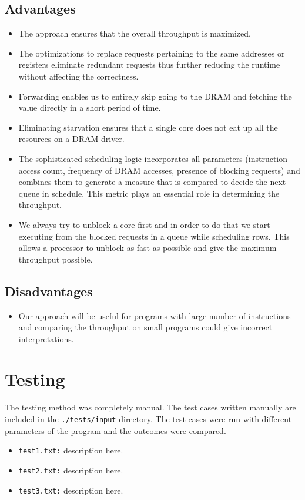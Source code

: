 \documentclass[hidelinks,12pt]{article}
\begin{document}
\subsection{Advantages}
\begin{itemize}
    \item The approach ensures that the overall throughput is maximized.
    \item The optimizations to replace requests pertaining to the same addresses or registers eliminate redundant requests thus further reducing the runtime without affecting the correctness.
    \item Forwarding enables us to entirely skip going to the DRAM and fetching the value directly in a short period of time.
    \item Eliminating starvation ensures that a single core does not eat up all the resources on a DRAM driver.
    \item The sophisticated scheduling logic incorporates all parameters (instruction access count, frequency of DRAM accesses, presence of blocking requests) and combines them to generate a measure that is compared to decide the next queue in schedule. This metric plays an essential role in determining the throughput.
    \item We always try to unblock a core first and in order to do that we start executing from the blocked requests in a queue while scheduling rows. This allows a processor to unblock as fast as possible and give the maximum throughput possible.
\end{itemize}
\subsection{Disadvantages}
\begin{itemize}
    \item Our approach will be useful for programs with large number of instructions and comparing the throughput on small programs could give incorrect interpretations.
\end{itemize}
\section{Testing}

The testing method was completely manual. The test cases written manually are included in the \verb|./tests/input| directory. The test cases were run with different parameters
of the program and the outcomes were compared.
\begin{itemize}
    \item \verb|test1.txt:| description here.
    \item \verb|test2.txt:| description here.
    \item \verb|test3.txt:| description here.
\end{itemize}
\end{document}
